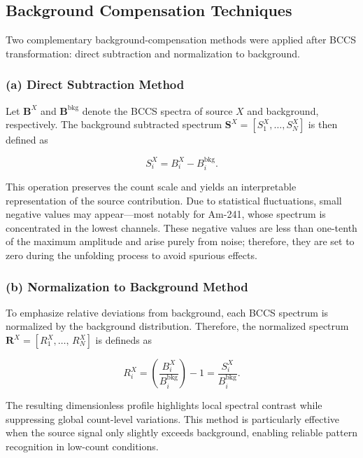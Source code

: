 \documentclass[10pt]{wlscirep}
\begin{document}
\subsection*{Background Compensation Techniques}

Two complementary background-compensation methods were applied after BCCS transformation: direct subtraction and normalization to background.

\subsubsection*{(a) Direct Subtraction Method}

Let $\mathbf{B}^X$ and $\mathbf{B}^\textrm{bkg}$ denote the BCCS spectra of source $X$ and background, respectively. The background subtracted spectrum $\mathbf{S}^X = [S^X_1,\ldots,S^X_N]$ is then defined as

\begin{equation}
S^X_i =  B^X_i - B_i^{\textrm{bkg}}. \label{eq:DS}
\end{equation}

This operation preserves the count scale and yields an interpretable representation of the source contribution. Due to statistical fluctuations, small negative values may appear—most notably for Am-241, whose spectrum is concentrated in the lowest channels. These negative values are less than one-tenth of the maximum amplitude and arise purely from noise; therefore, they are set to zero during the unfolding process to avoid spurious effects.


\subsubsection*{(b) Normalization to Background Method} 

To emphasize relative deviations from background, each BCCS spectrum is normalized by the background distribution. Therefore, the normalized spectrum $\mathbf{R}^X=[R^X_1,\ldots,\,R^X_N]$ is defineds as

\begin{equation}
R^X_i = \left(\dfrac{B^X_i}{B^{\textrm{bkg}}_i}\right) -1=\dfrac{S^X_i}{B_i^{\text{bkg}}}.\label{eq:NB}
\end{equation}

The resulting dimensionless profile highlights local spectral contrast while suppressing global count-level variations. This method is particularly effective when the source signal only slightly exceeds background, enabling reliable pattern recognition in low-count conditions.
\end{document}
